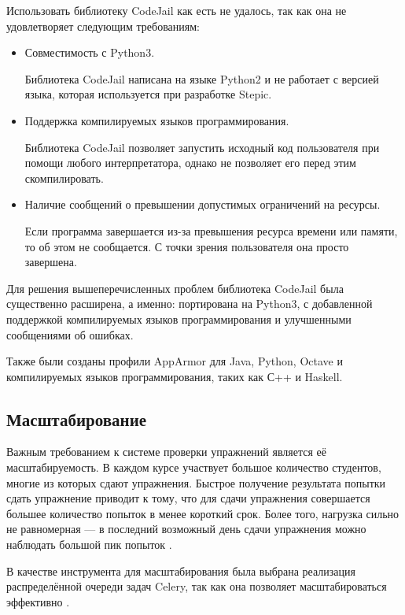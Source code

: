 \documentclass{matmex-diploma-custom}
\begin{document}
Использовать библиотеку CodeJail как есть не удалось, так как она не
удовлетворяет следующим требованиям:

\begin{itemize}

\item Совместимость с Python3.

  Библиотека CodeJail написана на языке Python2 и не работает с
  версией языка, которая используется при разработке Stepic.

\item Поддержка компилируемых языков программирования.

  Библиотека CodeJail позволяет запустить исходный код пользователя
  при помощи любого интерпретатора, однако не позволяет его перед этим
  скомпилировать.

\item Наличие сообщений о превышении допустимых ограничений на
  ресурсы.

  Если программа завершается из-за превышения ресурса времени или
  памяти, то об этом не сообщается. С точки зрения пользователя она
  просто завершена.

\end{itemize}

Для решения вышеперечисленных проблем библиотека CodeJail была
существенно расширена, а именно: портирована на Python3, с добавленной
поддержкой компилируемых языков программирования и улучшенными
сообщениями об ошибках.

Также были созданы профили AppArmor для Java, Python, Octave и
компилируемых языков программирования, таких как С++ и Haskell.

\subsection{Масштабирование}
Важным требованием к системе проверки упражнений является её
масштабируемость. В каждом курсе участвует большое количество
студентов, многие из которых сдают упражнения. Быстрое получение
результата попытки сдать упражнение приводит к тому, что для сдачи
упражнения совершается большее количество попыток в менее короткий
срок. Более того, нагрузка сильно не равномерная --- в последний
возможный день сдачи упражнения можно наблюдать большой пик попыток
\cite{breslow2013studying}.

В качестве инструмента для масштабирования была выбрана реализация
распределённой очереди задач Celery, так как она позволяет
масштабироваться эффективно \cite{celery}.
\end{document}
